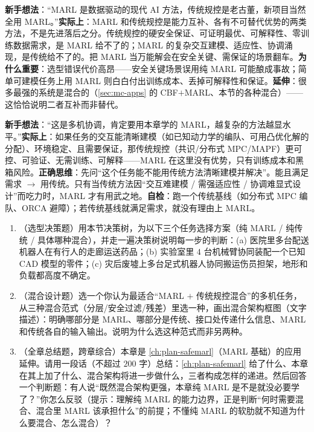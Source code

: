 \begin{pitfall}
\textbf{新手想法}：“MARL 是数据驱动的现代 AI 方法，传统规控是老古董，新项目当然全用 MARL。”\textbf{实际上}：MARL 和传统规控是能力互补、各有不可替代优势的两类方法，不是先进落后之分。传统规控的硬安全保证、可证明最优、可解释性、零训练数据需求，是 MARL 给不了的；MARL 的复杂交互建模、适应性、协调涌现，是传统给不了的。把 MARL 当万能解会在安全关键、需保证的场景翻车。\textbf{为什么重要}：选型错误代价高昂——安全关键场景误用纯 MARL 可能酿成事故；简单可建模任务上用 MARL 则白白付出训练成本、丢掉可解释性和保证。\textbf{延伸}：很多最强的系统是混合的（\cref{sec:mc-apps} 的 CBF$+$MARL、本节的各种混合）——这恰恰说明二者互补而非替代。
\end{pitfall}

\begin{pitfall}
\textbf{新手想法}：“这是多机协调，肯定要用本章学的 MARL，越复杂的方法越显水平。”\textbf{实际上}：如果任务的交互能清晰建模（如已知动力学的编队、可用凸优化解的分配）、环境稳定、且需要保证，那传统规控（共识/分布式 MPC/MAPF）更可控、可验证、无需训练、可解释——MARL 在这里没有优势，只有训练成本和黑箱风险。\textbf{正确思维}：先问“这个任务能不能用传统方法清晰建模并解决”。能且满足需求 $\to$ 用传统。只有当传统方法因“交互难建模 / 需强适应性 / 协调难显式设计”而吃力时，MARL 才有用武之地。\textbf{自检}：跑一个传统基线（如分布式 MPC 编队、ORCA 避障）；若传统基线就满足需求，就没有理由上 MARL。
\end{pitfall}

\begin{practice}
\begin{enumerate}
  \item （选型决策题）用本节决策树，为以下三个任务选择方案（纯 MARL / 纯传统 / 具体哪种混合），并走一遍决策树说明每一步的判断：(a) 医院里多台配送机器人在有行人的走廊运送药品；(b) 实验室里 $4$ 台机械臂协同装配一个已知 CAD 模型的零件；(c) 灾后废墟上多台足式机器人协同搬运伤员担架，地形和负载都高度不确定。
  \item （混合设计题）选一个你认为最适合“MARL $+$ 传统规控混合”的多机任务，从三种混合范式（分层/安全过滤/残差）里选一种，画出混合架构框图（文字描述）：明确哪部分是 MARL、哪部分是传统、接口处传递什么信息、MARL 和传统各自的输入输出。说明为什么选这种范式而非另两种。
  \item （全章总结题，跨章综合）本章是 \cref{ch:plan-safemarl}（MARL 基础）的应用延伸。请用一段话（不超过 $200$ 字）总结：\cref{ch:plan-safemarl} 给了什么、本章在其上加了什么、混合架构将进一步做什么，三者构成怎样的递进。然后回答一个判断题：有人说“既然混合架构更强，本章纯 MARL 是不是就没必要学了？”你怎么反驳（提示：理解纯 MARL 的能力边界，正是判断“何时需要混合、混合里 MARL 该承担什么”的前提；不懂纯 MARL 的软肋就不知道为什么要混合、怎么混合）？
\end{enumerate}
\end{practice}

